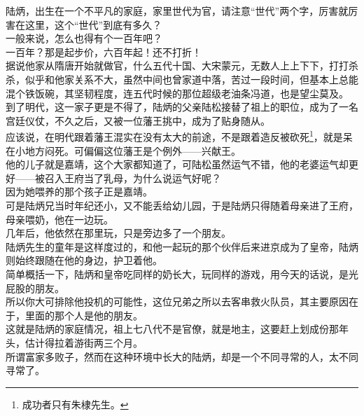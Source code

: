 \begin{multicols}{\theparacolNo}
陆炳，出生在一个不平凡的家庭，家里世代为官，请注意“世代”两个字，厉害就厉害在这里，这个“世代”到底有多久？\\

一般来说，怎么也得有个一百年吧？\\

一百年？那是起步价，六百年起！还不打折！\\

据说他家从隋唐开始就做官，什么五代十国、大宋蒙元，无数人上上下下，打打杀杀，似乎和他家关系不大，虽然中间也曾家道中落，苦过一段时间，但基本上总能混个铁饭碗，其坚韧程度，连五代时候的那位超级老油条冯道，也是望尘莫及。\\

到了明代，这一家子更是不得了，陆炳的父亲陆松接替了祖上的职位，成为了一名宫廷仪仗，不久之后，又被一位藩王挑中，成为了贴身随从。\\

应该说，在明代跟着藩王混实在没有太大的前途，不是跟着造反被砍死\footnote{成功者只有朱棣先生。}，就是呆在小地方闷死。可偏偏这位藩王是个例外——兴献王。\\

他的儿子就是嘉靖，这个大家都知道了，可陆松虽然运气不错，他的老婆运气却更好——被召入王府当了乳母，为什么说运气好呢？\\

因为她喂养的那个孩子正是嘉靖。\\

可是陆炳兄当时年纪还小，又不能丢给幼儿园，于是陆炳只得随着母亲进了王府，母亲喂奶，他在一边玩。\\

几年后，他依然在那里玩，只是旁边多了一个朋友。\\

陆炳先生的童年是这样度过的，和他一起玩的那个伙伴后来进京成为了皇帝，陆炳则始终跟随在他的身边，护卫着他。\\

简单概括一下，陆炳和皇帝吃同样的奶长大，玩同样的游戏，用今天的话说，是光屁股的朋友。\\

所以你大可排除他投机的可能性，这位兄弟之所以去客串救火队员，其主要原因在于，里面的那个人是他的朋友。\\

这就是陆炳的家庭情况，祖上七八代不是官僚，就是地主，这要赶上划成份那年头，估计得拉着游街两三个月。\\

所谓富家多败子，然而在这种环境中长大的陆炳，却是一个不同寻常的人，太不同寻常了。\\


\end{multicols}
